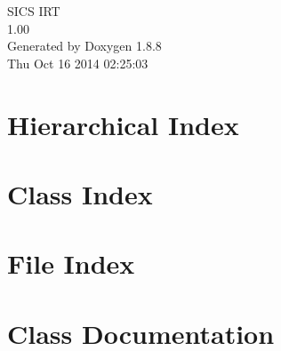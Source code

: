 \documentclass[twoside]{book}
\newcommand{\+}{\discretionary{\mbox{\scriptsize$\hookleftarrow$}}{}{}}
\newcommand{\clearemptydoublepage}{%
  \newpage{\pagestyle{empty}\cleardoublepage}%
}
\begin{document}
\hypersetup{pageanchor=false,
             bookmarks=true,
             bookmarksnumbered=true,
             pdfencoding=unicode
            }
\begin{titlepage}
\vspace*{7cm}
\begin{center}%
{\Large S\+I\+C\+S I\+R\+T \\[1ex]\large 1.\+00 }\\
\vspace*{1cm}
{\large Generated by Doxygen 1.8.8}\\
\vspace*{0.5cm}
{\small Thu Oct 16 2014 02:25:03}\\
\end{center}
\end{titlepage}
\clearemptydoublepage
\tableofcontents
\clearemptydoublepage
{}
\hypersetup{pageanchor=true}

\chapter{Hierarchical Index}

\chapter{Class Index}

\chapter{File Index}

\chapter{Class Documentation}

































\end{document}
